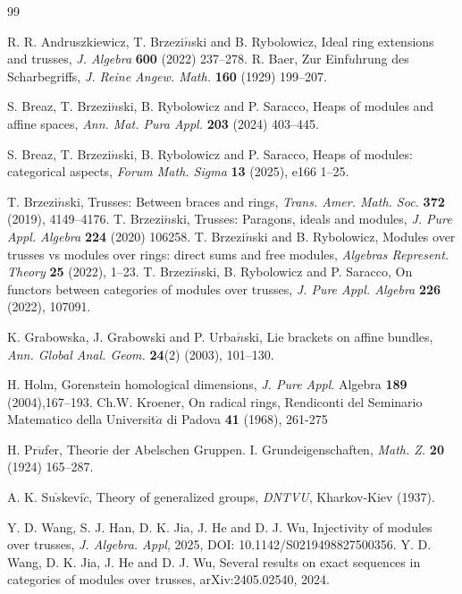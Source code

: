 \documentclass[11pt, twoside]{article}
\begin{document}
\begin{thebibliography}{99}
\addtolength{\itemsep}{-0.5em}

 R. R. Andruszkiewicz, T. Brzezi$\acute{n}$ski and B. Rybolowicz, Ideal ring extensions and trusses,
 \emph{J. Algebra} \textbf{600} (2022) 237--278.
R. Baer, Zur Einf$\ddot{u}$hrung des Scharbegriffs, \emph{J. Reine Angew. Math.} \textbf{160} (1929) 199--207.


  S. Breaz, T. Brzezi$\acute{n}$ski, B. Rybolowicz and  P. Saracco, Heaps of modules and affine spaces,  \emph{Ann. Mat. Pura Appl.} \textbf{203} (2024) 403--445.

 S. Breaz, T. Brzezi$\acute{n}$ski, B. Rybolowicz and  P. Saracco, Heaps of modules: categorical aspects, \emph{Forum Math. Sigma} \textbf{13} (2025), e166 1--25.

  T. Brzezi$\acute{n}$ski, Trusses: Between braces and rings, \emph{Trans. Amer. Math. Soc.} \textbf{372} (2019), 4149--4176.
 T. Brzezi$\acute{n}$ski, Trusses: Paragons, ideals and modules, \emph{J. Pure Appl. Algebra} \textbf{224} (2020) 106258.
 T. Brzezi$\acute{n}$ski and B. Rybolowicz, Modules over trusses vs modules over rings: direct sums and free modules, \emph{Algebras Represent. Theory}  \textbf{25} (2022), 1--23.
 T. Brzezi$\acute{n}$ski, B. Rybolowicz and P. Saracco, On functors between categories of modules over trusses, \emph{J. Pure Appl. Algebra}  \textbf{226} (2022), 107091.

 K. Grabowska, J. Grabowski and P. Urba$\acute{n}$ski, Lie brackets on affine bundles, \emph{Ann. Global Anal. Geom.} \textbf{24}(2) (2003), 101--130.

 H. Holm, Gorenstein homological dimensions, \emph{J. Pure Appl}. Algebra \textbf{189} (2004),167--193.
 Ch.W. Kroener, On radical rings, Rendiconti del Seminario Matematico della Universit$\grave{a}$ di Padova \textbf{41} (1968), 261-275

 H. Pr$\ddot{u}$fer, Theorie der Abelschen Gruppen. I. Grundeigenschaften, \emph{Math. Z.} \textbf{20} (1924) 165--287.


 A. K. Su$\check{s}$kevi$\check{c}$, Theory of generalized groups, \emph{DNTVU}, Kharkov-Kiev (1937).

 Y. D. Wang, S. J. Han, D. K. Jia, J. He and D. J. Wu, Injectivity of modules over trusses, \emph{J. Algebra. Appl}, 2025, DOI: 10.1142/S0219498827500356.
 Y. D. Wang, D. K. Jia, J. He and D. J. Wu, Several results on exact sequences in categories of modules over trusses, arXiv:2405.02540, 2024.





\end{thebibliography}
\end{document}
